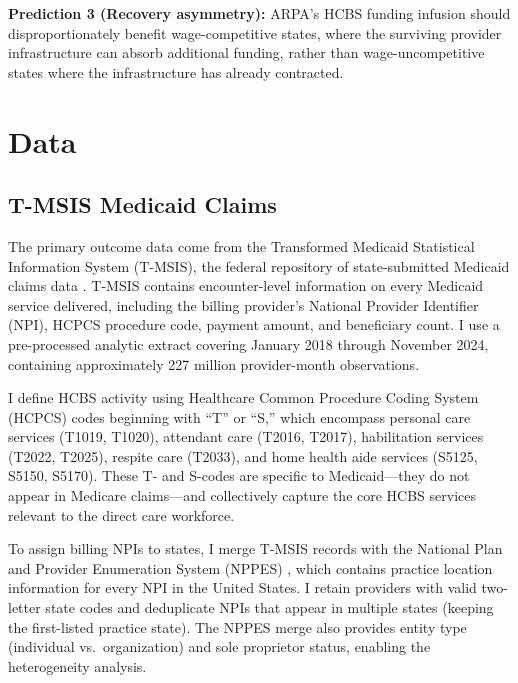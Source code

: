 \documentclass[12pt]{article}
\begin{document}
\textbf{Prediction 3 (Recovery asymmetry):} ARPA's HCBS funding infusion should disproportionately benefit wage-competitive states, where the surviving provider infrastructure can absorb additional funding, rather than wage-uncompetitive states where the infrastructure has already contracted.


\section{Data}

\subsection{T-MSIS Medicaid Claims}

The primary outcome data come from the Transformed Medicaid Statistical Information System (T-MSIS), the federal repository of state-submitted Medicaid claims data \citep{cms2024tmsis}. T-MSIS contains encounter-level information on every Medicaid service delivered, including the billing provider's National Provider Identifier (NPI), HCPCS procedure code, payment amount, and beneficiary count. I use a pre-processed analytic extract covering January 2018 through November 2024, containing approximately 227 million provider-month observations.

I define HCBS activity using Healthcare Common Procedure Coding System (HCPCS) codes beginning with ``T'' or ``S,'' which encompass personal care services (T1019, T1020), attendant care (T2016, T2017), habilitation services (T2022, T2025), respite care (T2033), and home health aide services (S5125, S5150, S5170). These T- and S-codes are specific to Medicaid---they do not appear in Medicare claims---and collectively capture the core HCBS services relevant to the direct care workforce.

To assign billing NPIs to states, I merge T-MSIS records with the National Plan and Provider Enumeration System (NPPES) \citep{nppes2023}, which contains practice location information for every NPI in the United States. I retain providers with valid two-letter state codes and deduplicate NPIs that appear in multiple states (keeping the first-listed practice state). The NPPES merge also provides entity type (individual vs.\ organization) and sole proprietor status, enabling the heterogeneity analysis.
\end{document}
